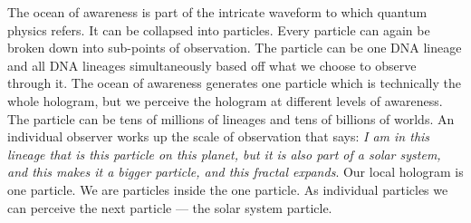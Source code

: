The ocean of awareness is part of the intricate waveform to which
quantum physics refers. It can be collapsed into particles. Every
particle can again be broken down into sub-points of observation. The
particle can be one DNA lineage and all DNA lineages simultaneously
based off what we choose to observe through it. The ocean of awareness
generates one particle which is technically the whole hologram, but we
perceive the hologram at different levels of awareness. The particle can
be tens of millions of lineages and tens of billions of worlds. An
individual observer works up the scale of observation that says: \emph{I
am in this lineage that is this particle on this planet, but it is also
part of a solar system, and this makes it a bigger particle, and this
fractal expands}. Our local hologram is one particle. We are particles
inside the one particle. As individual particles we can perceive the
next particle --- the solar system particle.
